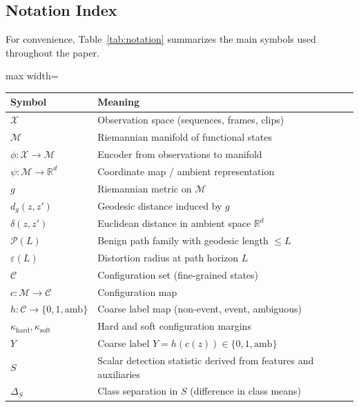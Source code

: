 \documentclass[11pt]{article}
\begin{document}
\subsection{Notation Index}
\label{subsec:notation-index}

For convenience, Table~\ref{tab:notation} summarizes the main symbols used throughout
the paper.

\begin{samepage}
\begin{table}[t]
    \centering
    \begin{adjustbox}{max width=\linewidth}
    \begin{tabular}{ll}
        \toprule
        Symbol & Meaning \\
        \midrule
        $\mathcal{X}$ & Observation space (sequences, frames, clips) \\
        $\mathcal{M}$ & Riemannian manifold of functional states \\
        $\phi:\mathcal{X}\to\mathcal{M}$ & Encoder from observations to manifold \\
        $\psi:\mathcal{M}\to\mathbb{R}^d$ & Coordinate map / ambient representation \\
        $g$ & Riemannian metric on $\mathcal{M}$ \\
        $d_g(z,z')$ & Geodesic distance induced by $g$ \\
        $\delta(z,z')$ & Euclidean distance in ambient space $\mathbb{R}^d$ \\
        $\mathcal{P}(L)$ & Benign path family with geodesic length $\le L$ \\
        $\varepsilon(L)$ & Distortion radius at path horizon $L$ \\
        $\mathcal{C}$ & Configuration set (fine-grained states) \\
        $c:\mathcal{M}\to\mathcal{C}$ & Configuration map \\
        $h:\mathcal{C}\to\{0,1,\mathrm{amb}\}$ & Coarse label map (non-event, event, ambiguous) \\
        $\kappa_{\mathrm{hard}},\kappa_{\mathrm{soft}}$ & Hard and soft configuration margins \\
        $Y$ & Coarse label $Y=h(c(z))\in\{0,1,\mathrm{amb}\}$ \\
        $S$ & Scalar detection statistic derived from features and auxiliaries \\
        $\Delta_S$ & Class separation in $S$ (difference in class means) \\

\end{tabular}
\end{adjustbox}
\end{table}
\end{samepage}
\end{document}
